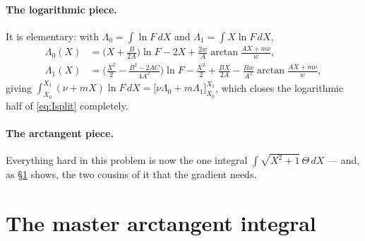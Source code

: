 \documentclass[11pt]{article}
\numberwithin{equation}{section}
\begin{document}
\paragraph{The logarithmic piece.} It is elementary: with
$\Lambda_0=\int\ln F\,dX$ and $\Lambda_1=\int X\ln F\,dX$,
\begin{align}
  \Lambda_0(X)&=\Big(X+\tfrac{B}{2A}\Big)\ln F-2X+\frac{2w}{A}\arctan\frac{AX+m\nu}{w},
    \label{eq:Lam0}\\
  \Lambda_1(X)&=\Big(\tfrac{X^2}{2}-\tfrac{B^2-2AC}{4A^2}\Big)\ln F-\tfrac{X^2}{2}+\tfrac{BX}{2A}
    -\frac{Bw}{A^2}\arctan\frac{AX+m\nu}{w},\label{eq:Lam1}
\end{align}
giving $\int_{X_0}^{X_1}(\nu+mX)\ln F\,dX=\big[\nu\Lambda_0+m\Lambda_1\big]_{X_0}^{X_1}$, which closes
the logarithmic half of \eqref{eq:Isplit} completely.

\paragraph{The arctangent piece.} Everything hard in this problem is now the one integral
$\int\sqrt{X^2+1}\,\Theta\,dX$ --- and, as \S\ref{sec:master} shows, the two cousins of it that
the gradient needs.

\section{The master arctangent integral}\label{sec:master}
\end{document}
